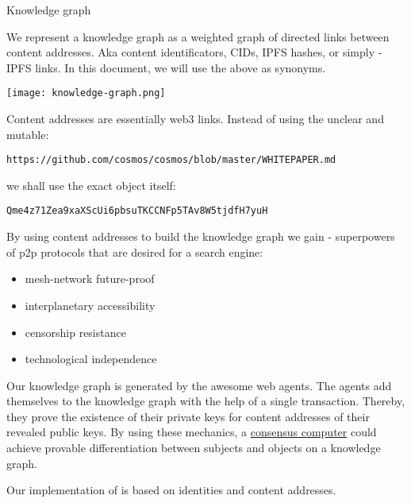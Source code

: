 \documentclass[8pt,oneside]{amsart}
\makeatletter
\newcommand{\linkred}[2]{\href{#1}{\color{red}{#2}}}
\newcommand{\linkgreen}[2]{\href{#1}{\color{green}{#2}}}
\renewcommand\subsection{\@startsection{subsection}
                                    {2}{\z@}
                                    {-3.25ex\@plus -1ex \@minus -.2ex}
                                    {0ex \@plus .2ex}
                                    {\play\Large}
                        }
\newcommand{\titleSection}[1]{\subsection{#1}}
\newenvironment{Figure}
  {\par\medskip\noindent\minipage{\linewidth}}
  {\endminipage\par\medskip}
\makeatother
\begin{document}
\titleSection{Knowledge graph}\label{knowledge-graph}

We represent a knowledge graph as a weighted graph of directed links between content addresses. Aka content identificators, CIDs, IPFS hashes, or simply - IPFS links. In this document, we will use the above as synonyms.

\begin{Figure}
    \centering
    \texttt{[image: knowledge-graph.png]}
\end{Figure}

Content addresses are essentially web3 links. Instead of using the unclear and mutable:
\begin{lstlisting}
https://github.com/cosmos/cosmos/blob/master/WHITEPAPER.md
\end{lstlisting}
we shall use the exact object itself:
\begin{lstlisting}
Qme4z71Zea9xaXScUi6pbsuTKCCNFp5TAv8W5tjdfH7yuH
\end{lstlisting}

By using content addresses to build the knowledge graph we gain \linkred{https://steemit.com/web3/@hipster/an-idea-of-decentralized-search-for-web3-ce860d61defe5est}{the so much needed} \linkgreen{https://ipfs.io/ipfs/QmV9tSDx9UiPeWExXEeH6aoDvmihvx6jD5eLb4jbTaKGps}{IPFS} - \linkgreen{https://ipfs.io/ipfs/QmXHGmfo4sjdHVW2MAxczAfs44RCpSeva2an4QvkzqYgfR}{like} superpowers of p2p protocols that are desired for a search engine:

\begin{itemize}
\item mesh-network future-proof
\item interplanetary accessibility
\item censorship resistance
\item technological independence
\end{itemize}

Our knowledge graph is generated by the awesome web agents. The agents add themselves to the knowledge graph with the help of a single transaction. Thereby, they prove the existence of their private keys for content addresses of their revealed public keys. By using these mechanics, a {\hyperref[consensus-computer]{consensus computer}} could achieve provable differentiation between subjects and objects on a knowledge graph.

Our implementation of \linkred{https://github.com/cybercongress/go-cyber}{go-cyber} is based on \linkred{https://github.com/cosmos/cosmos-sdk}{cosmos-SDK} identities and \linkred{https://github.com/multiformats/cid#cidv0}{CIDv0/CIDv1} content addresses.
\end{document}

